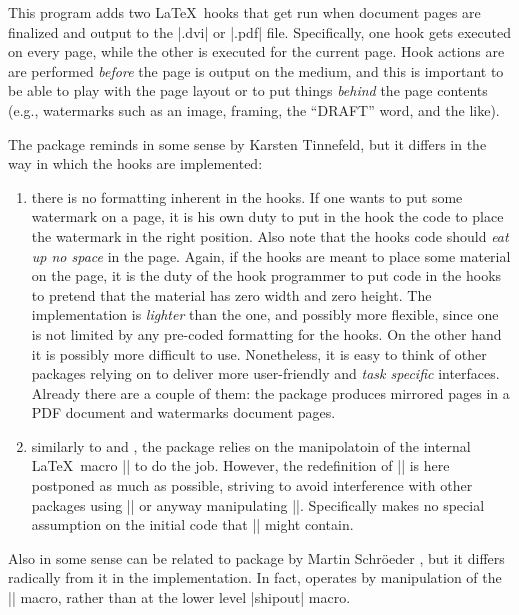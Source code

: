  
 This program adds two \LaTeX\ hooks that get run when document
 pages are finalized and output to the |.dvi| or |.pdf|
 file. Specifically, one hook gets executed on every page, while the
 other is executed for the current page. Hook actions are are performed
 \emph{before} the page is output on the medium, and this is
 important to be able to play with the page layout or to put things
 \emph{behind} the page contents (e.g., watermarks such as an image,
 framing, the ``DRAFT'' word, and the like).
 
 The package reminds in some sense  by Karsten
 Tinnefeld, but it differs in the way in which the hooks are
 implemented:
 


 \begin{enumerate}
 \item there is no formatting inherent in the hooks. If one wants to
   put some watermark on a page, it is his own duty to put in the
   hook the code to place the watermark in the right position. Also
   note that the hooks code should \emph{eat up no space} in the
   page.  Again, if the hooks are meant to place some material on the
   page, it is the duty of the hook programmer to put code in the
   hooks to pretend that the material has zero width and zero height.
   The implementation is \emph{lighter} than the  one,
   and possibly more flexible, since one is not limited by any
   pre-coded formatting for the hooks. On the other hand it is
   possibly more difficult to use. Nonetheless, it is easy to think
   of other packages relying on  to deliver more
   user-friendly and \emph{task specific} interfaces. Already there
   are a couple of them: the package  produces
   mirrored pages in a PDF document and 
   watermarks document pages.
 \item similarly to  and , the
   package relies on the manipolatoin of the internal \LaTeX\ macro
   |\@begindvi| to do the job. However, the redefinition of
   |\@begindvi| is here postponed as much as possible, striving to
   avoid interference with other packages using |\AtBeginDvi| or
   anyway manipulating |\@begindvi|. Specifically 
   makes no special assumption on the initial code that |\@begindvi|
   might contain.
 \end{enumerate}



Also in some sense  can be related to package
  by Martin Schr\"oeder \cite{everyshi}, but it differs radically from
 it in the implementation. In fact, operates by
 manipulation of the |\@begindvi| macro, rather than at the
 lower level |shipout| macro.

